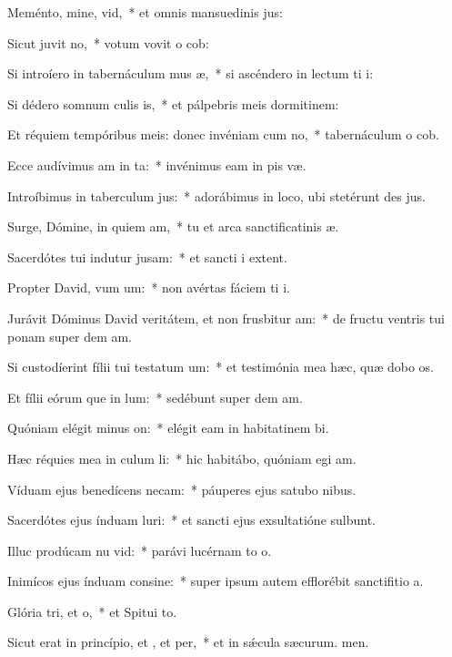 \item Meménto, mine, vid,~* et omnis mansuedinis jus:
\item Sicut juvit no,~* votum vovit o cob:
\item Si introíero in tabernáculum mus æ,~* si ascéndero in lectum ti i:
\item Si dédero somnum culis is,~* et pálpebris meis dormitinem:
\item Et réquiem tempóribus meis: donec invéniam cum no,~* tabernáculum o cob.
\item Ecce audívimus am in ta:~* invénimus eam in pis væ.
\item Introíbimus in taberculum jus:~* adorábimus in loco, ubi stetérunt des jus.
\item Surge, Dómine, in quiem am,~* tu et arca sanctificatinis æ.
\item Sacerdótes tui indutur jusam:~* et sancti i extent.
\item Propter David, vum um:~* non avértas fáciem ti i.
\item Jurávit Dóminus David veritátem, et non frusbitur am:~* de fructu ventris tui ponam super dem am.
\item Si custodíerint fílii tui testatum um:~* et testimónia mea hæc, quæ dobo os.
\item Et fílii eórum que in lum:~* sedébunt super dem am.
\item Quóniam elégit minus on:~* elégit eam in habitatinem bi.
\item Hæc réquies mea in culum li:~* hic habitábo, quóniam egi am.
\item Víduam ejus benedícens necam:~* páuperes ejus satubo nibus.
\item Sacerdótes ejus índuam luri:~* et sancti ejus exsultatióne sulbunt.
\item Illuc prodúcam nu vid:~* parávi lucérnam to o.
\item Inimícos ejus índuam consine:~* super ipsum autem efflorébit sanctifitio a.
\item Glória tri, et o,~* et Spitui to.
\item Sicut erat in princípio, et , et per,~* et in sǽcula sæcurum. men.
